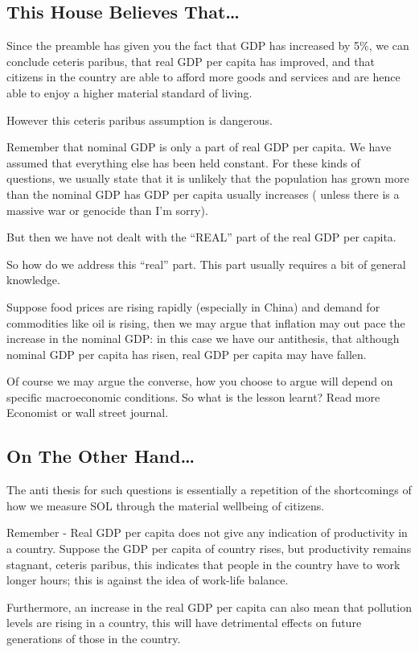 \subsection{This House Believes That\ldots}
Since the preamble has given you the fact that GDP has increased by 5\%, we can conclude ceteris paribus, that real GDP per capita has improved, and that citizens in the country are able to afford more goods and services and are hence able to enjoy a higher material standard of living.

However this ceteris paribus assumption is dangerous.

Remember that nominal GDP is only a part of real GDP per capita. We have assumed that everything else has been held constant. For these kinds of questions, we usually state that it is unlikely that the population has grown more than the nominal GDP has GDP per capita usually increases ( unless there is a massive war or genocide than I’m sorry).

But then we have not dealt with the “REAL” part of the real GDP per capita.

So how do we address this “real” part. This part usually requires a bit of general knowledge.

Suppose food prices are rising rapidly (especially in China) and demand for commodities like oil is rising, then we may argue that inflation may out pace the increase in the nominal GDP: in this case we have our antithesis, that although nominal GDP per capita has risen, real GDP per capita may have fallen.

Of course we may argue the converse, how you choose to argue will depend on specific macroeconomic conditions. So what is the lesson learnt? Read more Economist or wall street journal.
\subsection{On The Other Hand\ldots}
The anti thesis for such questions is essentially a repetition of the shortcomings of how we measure SOL through the material wellbeing of citizens.

Remember - Real GDP per capita does not give any indication of productivity in a country. Suppose the GDP per capita of country rises, but productivity remains stagnant, ceteris paribus, this indicates that people in the country have to work longer hours; this is against the idea of work-life balance.

Furthermore, an increase in the real GDP per capita can also mean that pollution levels are rising in a country, this will have detrimental effects on future generations of those in the country.

